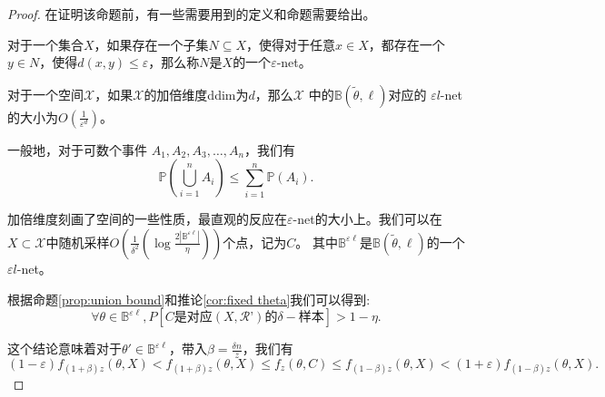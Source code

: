 \begin{proof}
    在证明该命题前，有一些需要用到的定义和命题需要给出。

    \begin{definition}
        对于一个集合$X$，如果存在一个子集$N \subseteq X$，使得对于任意$x \in X$，都存在一个$y \in N$，使得$d(x, y) \leq \varepsilon$，那么称$N$是$X$的一个$\varepsilon$-net。
    \end{definition}

    \begin{proposition}
        对于一个空间$\mathcal{X}$，如果$\mathcal{X}$的加倍维度ddim为$d$，那么$\mathcal{X}$
        中的$\mathbb{B}(\tilde{\theta}, \ell)$对应的
        $\varepsilon l$-net的大小为$O\left(\frac{1}{\varepsilon^d}\right)$。
        \label{prop:net}
    \end{proposition}

    \begin{proposition}
        一般地，对于可数个事件 $A_1, A_2, A_3, \dots ,A_n$，我们有
        \begin{equation*}
            \mathbb{P} \left( \bigcup_{i=1}^{n} A_i \right) \leq \sum_{i=1}^{n} \mathbb{P}(A_i).
        \end{equation*}
        \label{prop:union bound}
    \end{proposition}
    加倍维度刻画了空间的一些性质，最直观的反应在$\varepsilon$-net的大小上。我们可以在
$X\subset \mathcal{X}$中随机采样$O\left(\frac{1}{\delta^2}\left(\log \frac{2|\mathbb{B}^{\varepsilon \ell}|}{\eta}\right)\right)$个点，记为$C$。
其中$\mathbb{B}^{\varepsilon \ell}$是$\mathbb{B}(\tilde{\theta}, \ell)$的一个$\varepsilon l$-net。

根据命题\ref{prop:union bound}和推论\ref{cor:fixed theta}我们可以得到:
\begin{equation}
    \forall \theta \in \mathbb{B}^{\varepsilon \ell}, P\left[C\text{是对应}(X,\mathcal{R}’)\text{的}\delta-\text{样本}\right]>1-\eta.
\end{equation}

这个结论意味着对于$\theta' \in \mathbb{B}^{\varepsilon\ell}$，带入$\beta = \frac{\delta n }{z}$，我们有
\begin{equation*}
    (1-\varepsilon)f_{(1+\beta )z}(\theta, X) <
    f_{(1+\beta )z}(\theta, X) \leq 
    f_z(\theta, C) \leq f_{(1-\beta)z}(\theta, X) <
    (1+\varepsilon)f_{(1-\beta)z}(\theta, X).
\end{equation*}


\end{proof}
